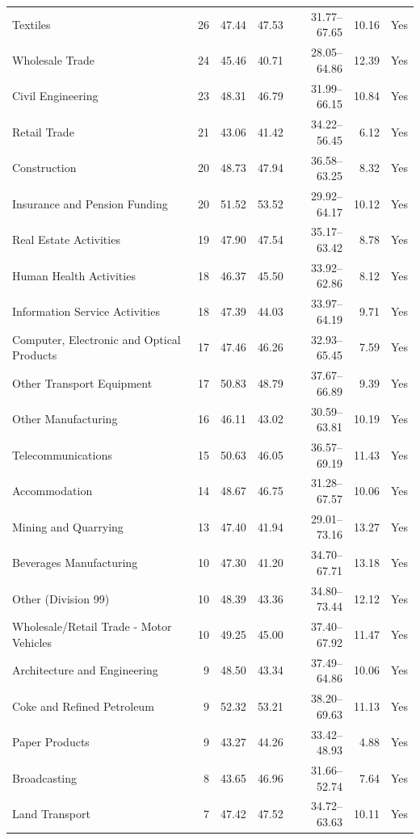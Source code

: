 {\begin{longtable}{@{}L{6.0cm}rrrrrr@{}}
Textiles & 26 & 47.44 & 47.53 & 31.77--67.65 & 10.16 & Yes \\
Wholesale Trade & 24 & 45.46 & 40.71 & 28.05--64.86 & 12.39 & Yes \\
Civil Engineering & 23 & 48.31 & 46.79 & 31.99--66.15 & 10.84 & Yes \\
Retail Trade & 21 & 43.06 & 41.42 & 34.22--56.45 & 6.12 & Yes \\
Construction & 20 & 48.73 & 47.94 & 36.58--63.25 & 8.32 & Yes \\
Insurance and Pension Funding & 20 & 51.52 & 53.52 & 29.92--64.17 & 10.12 & Yes \\
Real Estate Activities & 19 & 47.90 & 47.54 & 35.17--63.42 & 8.78 & Yes \\
Human Health Activities & 18 & 46.37 & 45.50 & 33.92--62.86 & 8.12 & Yes \\
Information Service Activities & 18 & 47.39 & 44.03 & 33.97--64.19 & 9.71 & Yes \\
Computer, Electronic and Optical Products & 17 & 47.46 & 46.26 & 32.93--65.45 & 7.59 & Yes \\
Other Transport Equipment & 17 & 50.83 & 48.79 & 37.67--66.89 & 9.39 & Yes \\
Other Manufacturing & 16 & 46.11 & 43.02 & 30.59--63.81 & 10.19 & Yes \\
Telecommunications & 15 & 50.63 & 46.05 & 36.57--69.19 & 11.43 & Yes \\
Accommodation & 14 & 48.67 & 46.75 & 31.28--67.57 & 10.06 & Yes \\
Mining and Quarrying & 13 & 47.40 & 41.94 & 29.01--73.16 & 13.27 & Yes \\
Beverages Manufacturing & 10 & 47.30 & 41.20 & 34.70--67.71 & 13.18 & Yes \\
Other (Division 99) & 10 & 48.39 & 43.36 & 34.80--73.44 & 12.12 & Yes \\
Wholesale/Retail Trade - Motor Vehicles & 10 & 49.25 & 45.00 & 37.40--67.92 & 11.47 & Yes \\
Architecture and Engineering & 9 & 48.50 & 43.34 & 37.49--64.86 & 10.06 & Yes \\
Coke and Refined Petroleum & 9 & 52.32 & 53.21 & 38.20--69.63 & 11.13 & Yes \\
Paper Products & 9 & 43.27 & 44.26 & 33.42--48.93 & 4.88 & Yes \\
Broadcasting & 8 & 43.65 & 46.96 & 31.66--52.74 & 7.64 & Yes \\
Land Transport & 7 & 47.42 & 47.52 & 34.72--63.63 & 10.11 & Yes \\

\end{longtable}}
